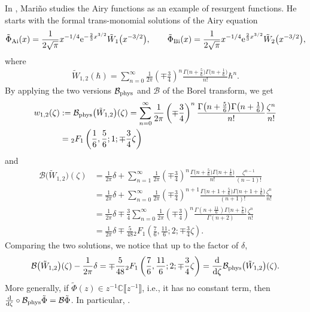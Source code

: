 \documentclass[10pt,a4paper]{amsart}
\newcommand{\C}{\mathbb{C}}
\newcommand{\series}[1]{\tilde{#1}}
\newcommand{\borel}{\mathcal{B}}
\numberwithin{equation}{section}
\begin{document}
In \cite{lectures-Marino}, Mari\~{n}o studies the Airy functions as an example of resurgent functions. He starts with the formal trans-monomial solutions of the Airy equation
\begin{align*}
\series{\Phi}_{\mathrm{Ai}}(x)=\frac{1}{2\sqrt{\pi}}x^{-1/4}{\rm e}^{-\frac{2}{3}x^{3/2}}\tilde{W}_1\bigl(x^{-3/2}\bigr),\qquad
\series{\Phi}_{\mathrm{Bi}}(x)=\frac{1}{2\sqrt{\pi}}x^{-1/4}{\rm e}^{\frac{2}{3}x^{3/2}}\tilde{W}_2\bigl(x^{-3/2}\bigr),
\end{align*}
where
\begin{align*}
\tilde{W}_{1,2}(\hbar)=\sum_{n=0}^{\infty}\frac{1}{2\pi}\left(\mp\frac{3}{4}\right)^{n}\frac{\Gamma\bigl(n+\frac{5}{6}\bigr)\Gamma\bigl(n+\frac{1}{6}\bigr)}{n!}\hbar^n.
\end{align*}
By applying the two versions $\borel_{{\rm phys}}$ and $\borel$ of the Borel transform, we get
\begin{align*}
w_{1,2}(\zeta)&:=\borel_{{\rm phys}}\bigl(\tilde{W}_{1,2}\bigr)(\zeta)=\sum_{n=0}^{\infty}\frac{1}{2\pi}\left(\mp\frac{3}{4}\right)^{n}\frac{\Gamma\bigl(n+\frac{5}{6}\bigr)\Gamma\bigl(n+\frac{1}{6}\bigr)}{n!}\frac{\zeta^n}{n!}\\
&={}_2F_1\left(\frac{1}{6},\frac{5}{6};1;\mp\frac{3}{4}\zeta\right)
\end{align*}
and
\begin{align*}
\borel\bigl(\tilde{W}_{1,2}\bigr)(\zeta)&=\frac{1}{2\pi}\delta+\sum_{n=1}^{\infty} \frac{1}{2\pi}\left(\mp\frac{3}{4}\right)^{n}\frac{\Gamma\bigl(n+\frac{5}{6}\bigr)\Gamma\bigl(n+\frac{1}{6}\bigr)}{n!}\frac{\zeta^{n-1}}{(n-1)!}\\
&=\frac{1}{2\pi}\delta+\sum_{n=0}^{\infty} \frac{1}{2\pi}\left(\mp\frac{3}{4}\right)^{n+1}\frac{\Gamma\bigl(n+1+\frac{5}{6}\bigr)\Gamma\bigl(n+1+\frac{1}{6}\bigr)}{(n+1)!}\frac{\zeta^{n}}{n!}\\
&=\frac{1}{2\pi}\delta\mp\frac{3}{4}\sum_{n=0}^{\infty} \frac{1}{2\pi}\left(\mp\frac{3}{4}\right)^{n}\frac{\Gamma(n+\frac{11}{6})\Gamma\bigl(n+\frac{7}{6}\bigr)}{\Gamma(n+2)}\frac{\zeta^{n}}{n!}\\
&=\frac{1}{2\pi}\delta\mp\frac{5}{48} {}_2F_1\left(\frac{7}{6},\frac{11}{6};2;\mp\frac{3}{4}\zeta\right).
\end{align*}
Comparing the two solutions, we notice that up to the factor of $\delta$,
\begin{equation}\label{Borel-W12}
\borel\bigl(\tilde{W}_{1,2}\bigr)(\zeta)-\frac{1}{2\pi}\delta=\mp \frac{5}{48} {}_2F_1\left(\frac{7}{6},\frac{11}{6};2;\mp\frac{3}{4}\zeta\right)=\frac{\rm d}{{\rm d}\zeta}\borel_{{\rm phys}}\bigl(\tilde{W}_{1,2}\bigr)(\zeta).
\end{equation}
More generally, if $\series{\Phi}(z)\in z^{-1}\C \big\llbracket z^{-1} \big\rrbracket$, i.e., it has no constant term, then
$
\frac{\rm d}{{\rm d}\zeta}\circ\borel_{{\rm phys}}\series{\Phi}=\borel\series{\Phi}$.
In particular, \smash{$\frac{\rm d}{{\rm d}\zeta}\circ\borel_{{\rm phys}}\bigl[z^{-1/2}\tilde{W}_{1}\bigr]\left(\frac{2}{3}\zeta\right)=v_1(\zeta)$}.
%
\end{document}
